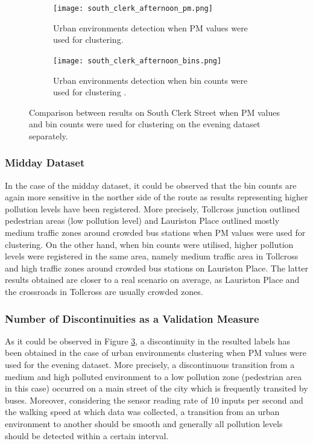 \documentclass[bsc,frontabs,twoside,singlespacing, parskip,deptreport]{infthesis}     %
\begin{document}
\begin{figure}[h!]
  \begin{subfigure}[t]{0.5\textwidth}
    \texttt{[image: south\_clerk\_afternoon\_pm.png]}
    \caption{Urban environments detection when PM values were used for clustering.}
    \label{fig:south-clerk-afternoon-pm}
  \end{subfigure}
  \hfill
  \begin{subfigure}[t]{0.5\textwidth}
    \texttt{[image: south\_clerk\_afternoon\_bins.png]}
    \caption{Urban environments detection when bin counts were used for clustering .}
    \label{fig:south-clerk-afternoon-bins}
  \end{subfigure}
  \caption{Comparison between results on South Clerk Street when PM values and bin counts were used for clustering on the evening dataset separately.}
  \label{fig:south-clerk-comparison}
\end{figure}


\subsubsection*{Midday Dataset}

In the case of the midday dataset, it could be observed that the bin counts are again more sensitive in the norther side of the route as results representing higher pollution levels have been registered. More precisely, Tollcross junction outlined pedestrian areas (low pollution level) and Lauriston Place outlined mostly medium traffic zones around crowded bus stations when PM values were used for clustering. On the other hand, when bin counts were utilised, higher pollution levels were registered in the same area, namely medium traffic area in Tollcross and high traffic zones around crowded bus stations on Lauriston Place. The latter results obtained are closer to a real scenario on average, as Lauriston Place and the crossroads in Tollcross are usually crowded zones.

\subsubsection*{Number of Discontinuities as a Validation Measure}

As it could be observed in Figure \ref{fig:south-clerk-comparison}, a discontinuity in the resulted labels has been obtained in the case of urban environments clustering when PM values were used for the evening dataset. More precisely, a discontinuous transition from a medium and high polluted environment to a low pollution zone (pedestrian area in this case) occurred on a main street of the city which is frequently transited by buses. Moreover, considering the sensor reading rate of 10 inputs per second and the walking speed at which data was collected, a transition from an urban environment to another should be smooth and generally all pollution levels should be detected within a certain interval.
\end{document}
